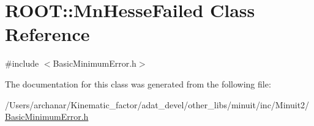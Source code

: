 \hypertarget{classROOT_1_1Minuit2_1_1BasicMinimumError_1_1MnHesseFailed}{}\section{R\+O\+OT\+:\+:Mn\+Hesse\+Failed Class Reference}
\label{classROOT_1_1Minuit2_1_1BasicMinimumError_1_1MnHesseFailed}


{\ttfamily \#include $<$Basic\+Minimum\+Error.\+h$>$}



The documentation for this class was generated from the following file\+:\begin{DoxyCompactItemize}
\item 
/\+Users/archanar/\+Kinematic\+\_\+factor/adat\+\_\+devel/other\+\_\+libs/minuit/inc/\+Minuit2/\mbox{\hyperlink{other__libs_2minuit_2inc_2Minuit2_2BasicMinimumError_8h}{Basic\+Minimum\+Error.\+h}}\end{DoxyCompactItemize}
